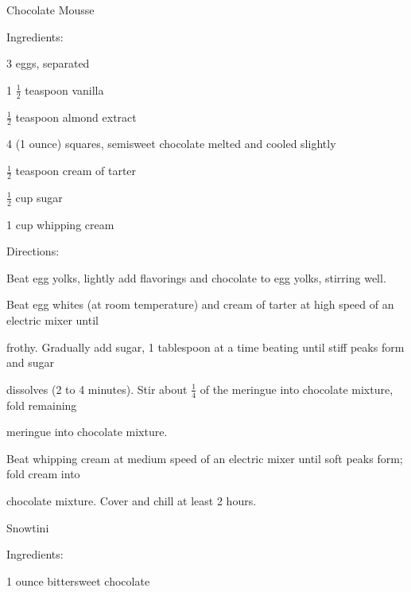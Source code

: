\documentclass[a4paper,portrait,12pt]{book}
\begin{document}
\newpage
Chocolate Mousse




Ingredients:




3 eggs, separated




1 $\frac{1}{2}$ teaspoon vanilla




$\frac{1}{2}$ teaspoon almond extract




4 (1 ounce) squares, semisweet chocolate melted and cooled slightly




$\frac{1}{2}$ teaspoon cream of tarter




$\frac{1}{2}$ cup sugar




1 cup whipping cream




Directions:




Beat egg yolks, lightly add flavorings and chocolate to egg yolks, stirring well.




Beat egg whites (at room temperature) and cream of tarter at high speed of an electric mixer until




frothy. Gradually add sugar, 1 tablespoon at a time beating until stiff peaks form and sugar




dissolves (2 to 4 minutes). Stir about $\frac{1}{4}$ of the meringue into chocolate mixture, fold remaining




meringue into chocolate mixture.




Beat whipping cream at medium speed of an electric mixer until soft peaks form; fold cream into




chocolate mixture. Cover and chill at least 2 hours.







\newpage
Snowtini




Ingredients:




1 ounce bittersweet chocolate
\end{document}
